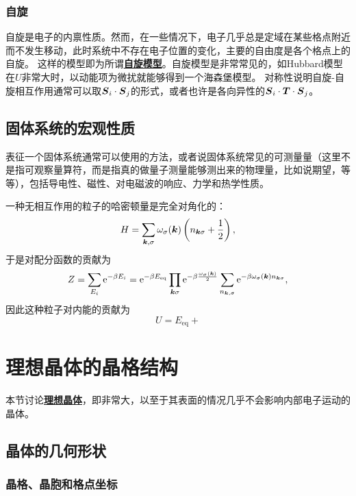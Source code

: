 \documentclass[hyperref, UTF8, a4paper]{ctexart}
\newcommand*{\ee}{\mathrm{e}}
\newcommand*{\concept}[1]{\underline{\textbf{#1}}}
\begin{document}
\subsubsection{自旋}

自旋是电子的内禀性质。然而，在一些情况下，电子几乎总是定域在某些格点附近而不发生移动，此时系统中不存在电子位置的变化，主要的自由度是各个格点上的自旋。
这样的模型即为所谓\concept{自旋模型}。自旋模型是非常常见的，如Hubbard模型在$U$非常大时，以动能项为微扰就能够得到一个海森堡模型。
对称性说明自旋-自旋相互作用通常可以取$\vb*{S}_i \cdot \vb*{S}_j$的形式，或者也许是各向异性的$\vb*{S}_i \cdot \vb*{T} \cdot \vb*{S}_j$。

\subsection{固体系统的宏观性质}

表征一个固体系统通常可以使用的方法，或者说固体系统常见的可测量量（这里不是指可观察量算符，而是指真的做量子测量能够测出来的物理量，比如说期望，等等），包括导电性、磁性、对电磁波的响应、力学和热学性质。

一种无相互作用的粒子的哈密顿量是完全对角化的：
\[
    H = \sum_{\vb*{k}, \sigma} \omega_\sigma(\vb*{k}) \left(n_{\vb*{k} \sigma} + \frac{1}{2}\right),
\]
于是对配分函数的贡献为
\begin{equation}
    Z = \sum_{E_i} \ee^{- \beta E_i} = \ee^{-\beta E_{\text{eq}}} \prod_{\vb*{k}\sigma} \ee^{- \beta \frac{\omega_\sigma(\vb*{k})}{2}} \sum_{n_{\vb*{k}, \sigma}} \ee^{-\beta \omega_\sigma(\vb*{k}) n_{\vb*{k} \sigma}},
\end{equation}
因此这种粒子对内能的贡献为
\begin{equation}
    U = E_{\text{eq}} +  
\end{equation}

\section{理想晶体的晶格结构}\label{sec:lattice-structure}

本节讨论\concept{理想晶体}，即非常大，以至于其表面的情况几乎不会影响内部电子运动的晶体。

\subsection{晶体的几何形状}

\subsubsection{晶格、晶胞和格点坐标}
\end{document}
